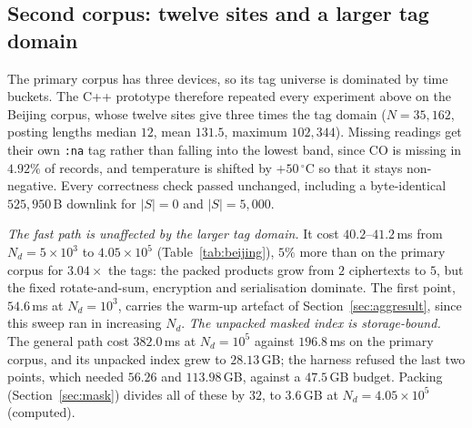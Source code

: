 \documentclass[a4paper,fleqn]{cas-sc}
\begin{document}
\subsection{Second corpus: twelve sites and a larger tag domain}
\label{sec:secondcorpus}
The primary corpus has three devices, so its tag universe is dominated by time
buckets. The C++ prototype therefore repeated every experiment above on the
Beijing corpus, whose twelve sites give three times the tag domain
($N=35{,}162$, posting lengths median $12$, mean $131.5$, maximum $102{,}344$).
Missing readings get their own \texttt{:na} tag rather than falling into the
lowest band, since CO is missing in $4.92\%$ of records, and temperature is
shifted by $+50\,^\circ$C so that it stays non-negative. Every correctness
check passed unchanged, including a byte-identical $525{,}950$\,B downlink for
$|S|=0$ and $|S|=5{,}000$.

\emph{The fast path is unaffected by the larger tag domain.} It cost
$40.2$--$41.2$\,ms from $N_d=5\times10^3$ to $4.05\times10^5$
(Table~\ref{tab:beijing}), $5\%$ more than on the primary corpus for
$3.04\times$ the tags: the packed products grow from $2$ ciphertexts to $5$,
but the fixed rotate-and-sum, encryption and serialisation dominate. The first
point, $54.6$\,ms at $N_d=10^3$, carries the warm-up artefact of
Section~\ref{sec:aggresult}, since this sweep ran in increasing $N_d$.
\emph{The unpacked masked index is storage-bound.} The general path cost
$382.0$\,ms at $N_d=10^5$ against $196.8$\,ms on the primary corpus, and its
unpacked index grew to $28.13$\,GB; the harness refused the last two points,
which needed $56.26$ and $113.98$\,GB, against a $47.5$\,GB budget. Packing
(Section~\ref{sec:mask}) divides all of these by $32$, to $3.6$\,GB at
$N_d=4.05\times10^5$ (computed).
\end{document}
